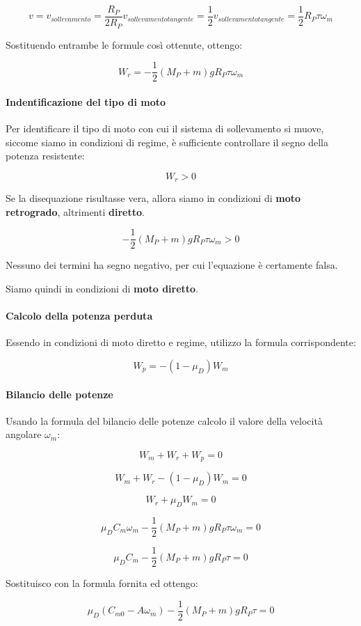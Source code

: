 \documentclass[main.tex]{subfiles}
\begin{document}
\[
	v = v_{sollevamento} = \dfrac{R_P}{2R_P}v_{sollevamento tangente} = \dfrac{1}{2}v_{sollevamento tangente} = \dfrac{1}{2}R_P\tau\omega_m
\]

Sostituendo entrambe le formule così ottenute, ottengo:

\[
	W_r = -\dfrac{1}{2}(M_P + m)gR_P\tau\omega_m
\]

\paragraph{Indentificazione del tipo di moto} Per identificare il tipo di moto con cui il sistema di sollevamento si muove, siccome siamo in condizioni di regime, è sufficiente controllare il segno della potenza resistente:

\[
	W_r > 0
\]

Se la disequazione risultasse vera, allora siamo in condizioni di \textbf{moto retrogrado}, altrimenti \textbf{diretto}.

\[
	 -\dfrac{1}{2}(M_P + m)gR_P\tau\omega_m > 0
\]

Nessuno dei termini ha segno negativo, per cui l'equazione è certamente falsa.

Siamo quindi in condizioni di \textbf{moto diretto}.

\paragraph{Calcolo della potenza perduta} Essendo in condizioni di moto diretto e regime, utilizzo la formula corrispondente:

\[
	W_p = -(1-\mu_D)W_m
\]

\paragraph{Bilancio delle potenze} Usando la formula del bilancio delle potenze calcolo il valore della velocità angolare $\omega_m$:

\[
	W_m + W_r + W_p = 0
\]

\[
	W_m + W_r - (1-\mu_D)W_m = 0
\]

\[
	W_r + \mu_DW_m = 0
\]

\[
	\mu_DC_m\omega_m -\dfrac{1}{2}(M_P + m)gR_P\tau\omega_m= 0
\]

\[
	\mu_DC_m -\dfrac{1}{2}(M_P + m)gR_P\tau = 0
\]

Sostituisco con la formula fornita ed ottengo:

\[
	\mu_D(C_{m0}-A\omega_m) -\dfrac{1}{2}(M_P + m)gR_P\tau = 0
\]
\end{document}
